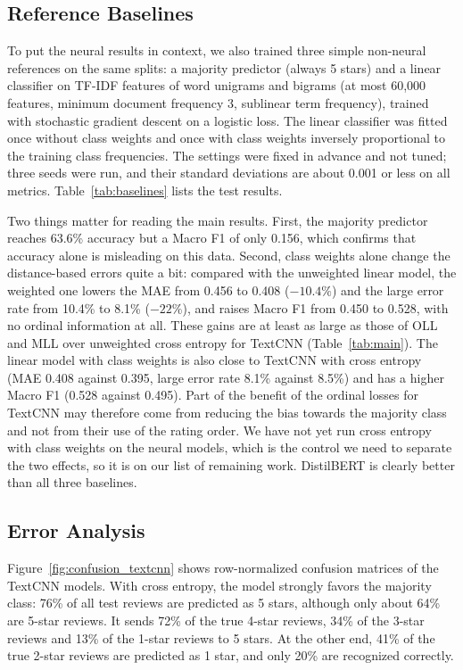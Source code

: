\subsection{Reference Baselines}
\label{sec:baselines}
To put the neural results in context, we also trained three simple non-neural references on the same splits: a majority predictor (always 5 stars) and a linear classifier on TF-IDF features of word unigrams and bigrams (at most 60{,}000 features, minimum document frequency 3, sublinear term frequency), trained with stochastic gradient descent on a logistic loss. The linear classifier was fitted once without class weights and once with class weights inversely proportional to the training class frequencies. The settings were fixed in advance and not tuned; three seeds were run, and their standard deviations are about 0.001 or less on all metrics. Table~\ref{tab:baselines} lists the test results.

\begin{table}[t]
\caption{Test results of the non-neural reference baselines (TF-IDF: mean of three seeds).}
\label{tab:baselines}
\centering

\end{table}

Two things matter for reading the main results. First, the majority predictor reaches 63.6\% accuracy but a Macro F1 of only 0.156, which confirms that accuracy alone is misleading on this data. Second, class weights alone change the distance-based errors quite a bit: compared with the unweighted linear model, the weighted one lowers the MAE from 0.456 to 0.408 ($-10.4\%$) and the large error rate from 10.4\% to 8.1\% ($-22\%$), and raises Macro F1 from 0.450 to 0.528, with no ordinal information at all. These gains are at least as large as those of OLL and MLL over unweighted cross entropy for TextCNN (Table~\ref{tab:main}). The linear model with class weights is also close to TextCNN with cross entropy (MAE 0.408 against 0.395, large error rate 8.1\% against 8.5\%) and has a higher Macro F1 (0.528 against 0.495). Part of the benefit of the ordinal losses for TextCNN may therefore come from reducing the bias towards the majority class and not from their use of the rating order. We have not yet run cross entropy with class weights on the neural models, which is the control we need to separate the two effects, so it is on our list of remaining work. DistilBERT is clearly better than all three baselines.

\subsection{Error Analysis}
\label{sec:errors}
Figure~\ref{fig:confusion_textcnn} shows row-normalized confusion matrices of the TextCNN models. With cross entropy, the model strongly favors the majority class: 76\% of all test reviews are predicted as 5 stars, although only about 64\% are 5-star reviews. It sends 72\% of the true 4-star reviews, 34\% of the 3-star reviews and 13\% of the 1-star reviews to 5 stars. At the other end, 41\% of the true 2-star reviews are predicted as 1 star, and only 20\% are recognized correctly.

